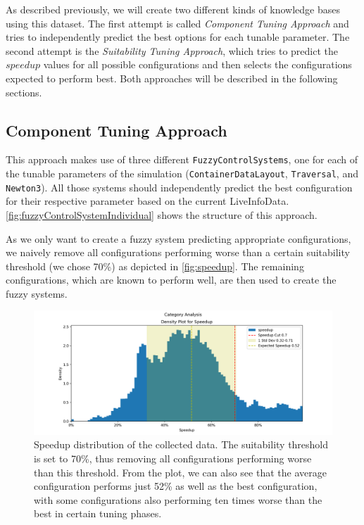 As described previously, we will create two different kinds of knowledge bases using this dataset. The first attempt is called \emph{Component Tuning Approach} and tries to independently predict the best options for each tunable parameter. The second attempt is the \emph{Suitability Tuning Approach}, which tries to predict the $speedup$ values for all possible configurations and then selects the configurations expected to perform best. Both approaches will be described in the following sections.

\subsection{Component Tuning Approach}

This approach makes use of three different \texttt{FuzzyControlSystems}, one for each of the tunable parameters of the simulation (\texttt{ContainerDataLayout}, \texttt{Traversal}, and \texttt{Newton3}). All those systems should independently predict the best configuration for their respective parameter based on the current LiveInfoData. \autoref{fig:fuzzyControlSystemIndividual} shows the structure of this approach.

As we only want to create a fuzzy system predicting appropriate configurations, we naively remove all configurations performing worse than a certain suitability threshold (we chose 70\%) as depicted in \autoref{fig:speedup}. The remaining configurations, which are known to perform well, are then used to create the fuzzy systems.


\begin{figure}[H]
    \centering
    \includegraphics[width=\columnwidth,trim={1cm 0 2cm 1.5cm},clip]{figures/DataAnalytics/speedup.png}
    \caption[Speedup distribution of the collected data]{Speedup distribution of the collected data. The suitability threshold is set to 70\%, thus removing all configurations performing worse than this threshold. From the plot, we can also see that the average configuration performs just 52\% as well as the best configuration, with some configurations also performing ten times worse than the best in certain tuning phases.}
    \label{fig:speedup}
\end{figure}

